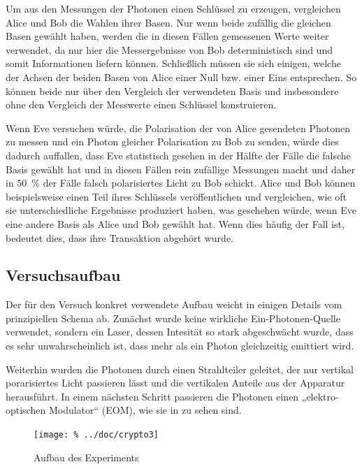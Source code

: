 Um aus den Messungen der Photonen einen Schlüssel zu erzeugen, vergleichen
Alice und Bob die Wahlen ihrer Basen. Nur wenn beide zufällig die gleichen Basen
gewählt haben, werden die in diesen Fällen gemessenen Werte weiter verwendet, da
nur hier die Messergebnisse von Bob deterministisch sind und somit Informationen
liefern können. Schließlich müssen sie sich einigen, welche der Achsen der
beiden Basen von Alice einer Null bzw. einer Eins entsprechen. So können beide
nur über den Vergleich der verwendeten Basis und insbesondere ohne den
Vergleich der Messwerte einen Schlüssel konstruieren.

Wenn Eve versuchen würde, die Polarisation der von Alice gesendeten Photonen zu
messen und ein Photon gleicher Polarisation zu Bob zu senden, würde dies
dadurch auffallen, dass Eve statistisch gesehen in der Hälfte der Fälle die
falsche Basis gewählt hat und in diesen Fällen rein zufällige Messungen macht
und daher in \SI{50}{\percent} der Fälle falsch polarisiertes Licht zu Bob
schickt. Alice und Bob können beispielsweise einen Teil ihres Schlüssels
veröffentlichen und vergleichen, wie oft sie unterschiedliche Ergebnisse
produziert haben, was geschehen würde, wenn Eve eine andere Basis als Alice und
Bob gewählt hat. Wenn dies häufig der Fall ist, bedeutet dies, dass ihre
Transaktion abgehört wurde. 

\subsection{Versuchsaufbau}

Der für den Versuch konkret verwendete Aufbau weicht in einigen Details vom
prinzipiellen Schema ab. Zunächst wurde keine wirkliche Ein-Photonen-Quelle
verwendet, sondern ein Laser, dessen Intesität so stark abgeschwächt wurde,
dass es sehr unwahrscheinlich ist, dass mehr als ein Photon gleichzeitig
emittiert wird.

Weiterhin wurden die Photonen durch einen Strahlteiler geleitet, der nur
vertikal porarisiertes Licht passieren lässt und die vertikalen Anteile aus der
Apparatur herausführt. In einem nächsten Schritt passieren die Photonen einen 
„elektro-optischen Modulator“ (EOM), wie sie in  zu sehen sind.

\begin{figure}[htb]
 \centering
 \texttt{[image: \%
  ../doc/crypto3]}
 \caption{Aufbau des Experiments}
 \label{fig:aufbau}
\end{figure}

